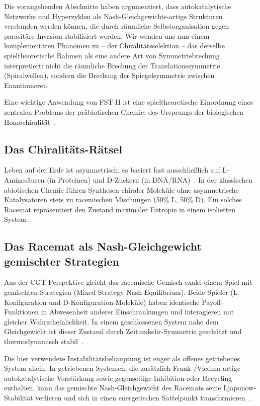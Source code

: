 \documentclass[12pt,a4paper]{article}
\theoremstyle{remark}
\begin{document}
Die vorangehenden Abschnitte haben argumentiert, dass autokatalytische Netzwerke und Hyperzyklen als Nash-Gleichgewichts-artige Strukturen verstanden werden können, die durch räumliche Selbstorganisation gegen parasitäre Invasion stabilisiert werden. Wir wenden uns nun einem komplementären Phänomen zu -- der Chiralitätsselektion -- das derselbe spieltheoretische Rahmen als eine andere Art von Symmetriebrechung interpretiert: nicht die räumliche Brechung der Translationssymmetrie (Spiralwellen), sondern die Brechung der Spiegelsymmetrie zwischen Enantiomeren.

Eine wichtige Anwendung von FST-II ist eine spieltheoretische Einordnung eines zentralen Problems der präbiotischen Chemie: des Ursprungs der biologischen Homochiralität~\citep{Blackmond2010,Biochirality}.

\subsection{Das Chiralitäts-Rätsel}

Leben auf der Erde ist asymmetrisch; es basiert fast ausschließlich auf L-Aminosäuren (in Proteinen) und D-Zuckern (in DNA/RNA)~\citep{HomochiralityThermo}. In der klassischen abiotischen Chemie führen Synthesen chiraler Moleküle ohne asymmetrische Katalysatoren stets zu racemischen Mischungen (50\% L, 50\% D). Ein solches Racemat repräsentiert den Zustand maximaler Entropie in einem isolierten System.

\subsection{Das Racemat als Nash-Gleichgewicht gemischter Strategien}

Aus der CGT-Perspektive gleicht das racemische Gemisch exakt einem Spiel mit gemischten Strategien (Mixed Strategy Nash Equilibrium). Beide \glqq Spieler\grqq{} (L-Konfiguration und D-Konfiguration-Moleküle) haben identische Payoff-Funktionen in Abwesenheit anderer Einschränkungen und interagieren mit gleicher Wahrscheinlichkeit. In einem geschlossenen System nahe dem Gleichgewicht ist dieser Zustand durch Zeitumkehr-Symmetrie geschützt und thermodynamisch stabil~\citep{PlassonReview2007,TimeReversalSymmetry}.

Die hier verwendete Instabilitätsbehauptung ist enger als \glqq offenes getriebenes System\grqq{} allein. In getriebenen Systemen, die zusätzlich Frank-/Viedma-artige autokatalytische Verstärkung sowie gegenseitige Inhibition oder Recycling enthalten, kann das gemischte Nash-Gleichgewicht des Racemats seine Ljapunow-Stabilität verlieren und sich in einen energetischen Sattelpunkt transformieren~\citep{Frank1953,PlassonReview2007}.
\end{document}
